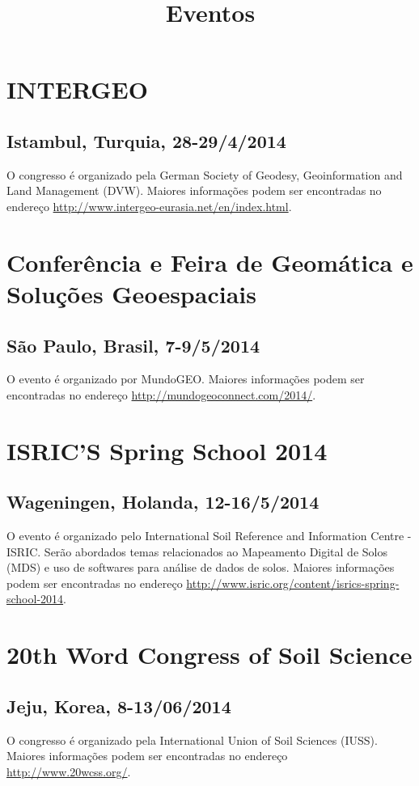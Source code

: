 ﻿\title{Eventos}
\maketitle


\section{INTERGEO}
\subsection{Istambul, Turquia, 28-29/4/2014}
O congresso é organizado pela German Society of Geodesy, Geoinformation and Land Management (DVW). 
Maiores informações podem ser encontradas no endereço \url{http://www.intergeo-eurasia.net/en/index.html}.


\section{Conferência e Feira de Geomática e Soluções Geoespaciais}
\subsection{São Paulo, Brasil, 7-9/5/2014}
O evento é organizado por MundoGEO.
Maiores informações podem ser encontradas no endereço \url{http://mundogeoconnect.com/2014/}.


\section{ISRIC'S Spring School 2014}
\subsection{Wageningen, Holanda, 12-16/5/2014}
O evento é organizado pelo International Soil Reference and Information Centre - ISRIC. Serão abordados temas relacionados ao Mapeamento Digital de Solos (MDS) e uso de softwares para análise de dados de solos.
Maiores informações podem ser encontradas no endereço \url{http://www.isric.org/content/isrics-spring-school-2014}.


\section{20th Word Congress of Soil Science}
\subsection{Jeju, Korea, 8-13/06/2014}
O congresso é organizado pela International Union of Soil Sciences (IUSS). 
Maiores informações podem ser encontradas no endereço \url{http://www.20wcss.org/}.


